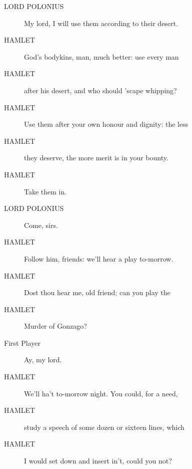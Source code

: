 \documentclass{article}
\begin{document}
\begin{description}
            
\item[LORD POLONIUS] My lord, I will use them according to their desert.
\end{description}
          
\begin{description}
            
\item[HAMLET] God's bodykins, man, much better: use every man
\item[HAMLET] after his desert, and who should 'scape whipping?
\item[HAMLET] Use them after your own honour and dignity: the less
\item[HAMLET] they deserve, the more merit is in your bounty.
\item[HAMLET] Take them in.
\end{description}
          
\begin{description}
            
\item[LORD POLONIUS] Come, sirs.
\end{description}
          
\begin{description}
            
\item[HAMLET] Follow him, friends: we'll hear a play to-morrow.
\item[HAMLET] Dost thou hear me, old friend; can you play the
\item[HAMLET] Murder of Gonzago?
\end{description}
          
\begin{description}
            
\item[First Player] Ay, my lord.
\end{description}
          
\begin{description}
            
\item[HAMLET] We'll ha't to-morrow night. You could, for a need,
\item[HAMLET] study a speech of some dozen or sixteen lines, which
\item[HAMLET] I would set down and insert in't, could you not?
\end{description}
          
\end{document}
